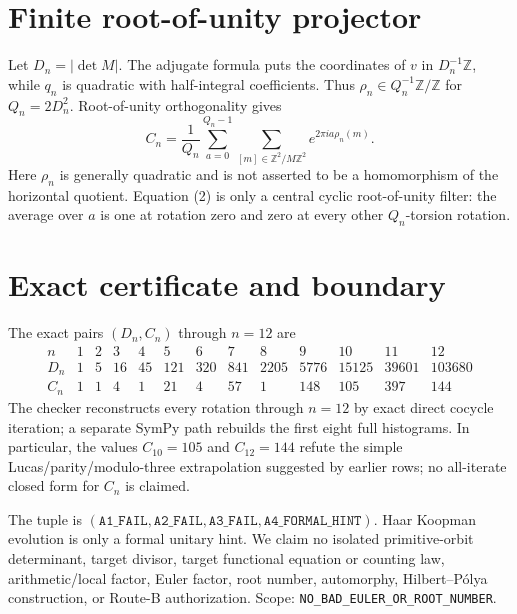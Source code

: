 \documentclass[10pt]{article}
\begin{document}
\section{Finite root-of-unity projector}
Let $D_n=|\det M|$.  The adjugate formula puts the coordinates of $v$ in
$D_n^{-1}\mathbb Z$, while $q_n$ is quadratic with half-integral
coefficients.  Thus $\rho_n\in Q_n^{-1}\mathbb Z/\mathbb Z$ for
$Q_n=2D_n^2$.  Root-of-unity orthogonality gives
\begin{equation}
C_n=\frac{1}{Q_n}\sum_{a=0}^{Q_n-1}
 \sum_{[m]\in\mathbb Z^2/M\mathbb Z^2}
e^{2\pi i a\rho_n(m)}.                           \tag{2}
\end{equation}
Here $\rho_n$ is generally quadratic and is not asserted to be a homomorphism
of the horizontal quotient.  Equation (2) is only a central cyclic
root-of-unity filter: the average over $a$ is one at rotation zero and zero at
every other $Q_n$-torsion rotation.

\section{Exact certificate and boundary}
The exact pairs $(D_n,C_n)$ through $n=12$ are
\[
\begin{array}{c|rrrrrrrrrrrr}
n&1&2&3&4&5&6&7&8&9&10&11&12\\ \hline
D_n&1&5&16&45&121&320&841&2205&5776&15125&39601&103680\\
C_n&1&1&4&1&21&4&57&1&148&105&397&144
\end{array}
\]
The checker reconstructs every rotation through $n=12$ by exact direct
cocycle iteration; a separate SymPy path rebuilds the first eight full
histograms.  In particular, the values $C_{10}=105$ and $C_{12}=144$ refute
the simple Lucas/parity/modulo-three extrapolation suggested by earlier rows;
no all-iterate closed form for $C_n$ is claimed.

The tuple is $(\texttt{A1\_FAIL},\texttt{A2\_FAIL},
\texttt{A3\_FAIL},\texttt{A4\_FORMAL\_HINT})$.  Haar Koopman evolution is
only a formal unitary hint.  We claim no isolated primitive-orbit determinant,
target divisor, target functional equation or counting law, arithmetic/local
factor, Euler factor, root number, automorphy, Hilbert--P\'olya construction,
or Route-B authorization.  Scope:
\texttt{NO\_BAD\_EULER\_OR\_ROOT\_NUMBER}.
\end{document}
